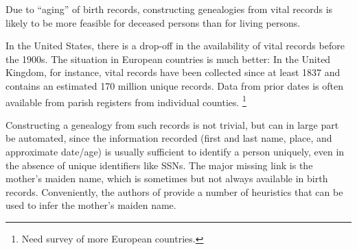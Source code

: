 \documentclass{article}
\begin{document}
Due to ``aging'' of birth records, constructing genealogies from vital records is likely to be more feasible for deceased persons than for living persons.

In the United States, there is a drop-off in the availability of vital records before the 1900s. The situation in European countries is much better: In the United Kingdom, for instance, vital records have been collected since at least 1837 \cite{ukbmd.org.uk} and contains an estimated 170 million unique records. Data from prior dates is often available from parish registers from individual counties. \footnote{Need survey of more European countries.} 


Constructing a genealogy from such records is not trivial, but can in large part be automated, since the information recorded (first and last name, place, and approximate date/age) is usually sufficient to identify a person uniquely, even in the absence of unique identifiers like SSNs.  The major missing link is the mother's maiden name, which is sometimes but not always available in birth records.  Conveniently, the authors of \cite{messing} provide a number of heuristics that can be used to infer the mother's maiden name.
\end{document}
